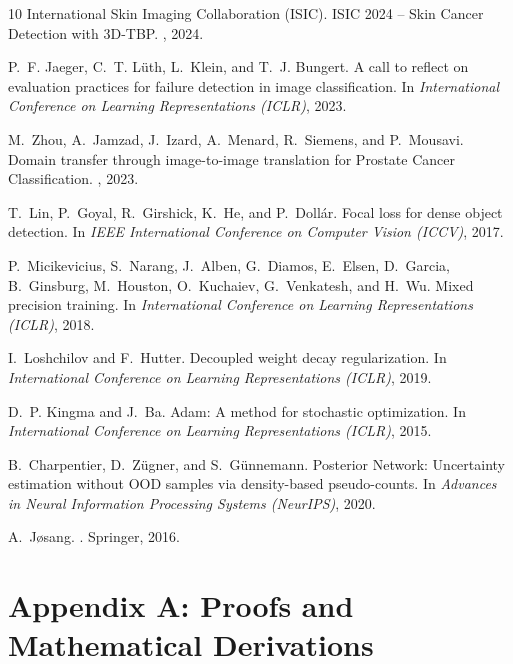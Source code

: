 \documentclass[letterpaper]{article} %
\begin{document}
\begin{thebibliography}{10}
International Skin Imaging Collaboration (ISIC).
\newblock ISIC 2024 -- Skin Cancer Detection with 3D-TBP.
, 2024.

P.~F. Jaeger, C.~T. L{\"u}th, L.~Klein, and T.~J. Bungert.
\newblock A call to reflect on evaluation practices for failure detection in image classification.
\newblock In {\em International Conference on Learning Representations (ICLR)}, 2023.

M.~Zhou, A.~Jamzad, J.~Izard, A.~Menard, R.~Siemens, and P.~Mousavi.
\newblock Domain transfer through image-to-image translation for Prostate Cancer Classification.
, 2023.

T.~Lin, P.~Goyal, R.~Girshick, K.~He, and P.~Doll{\'a}r.
\newblock Focal loss for dense object detection.
\newblock In {\em IEEE International Conference on Computer Vision (ICCV)}, 2017.

P.~Micikevicius, S.~Narang, J.~Alben, G.~Diamos, E.~Elsen, D.~Garcia, B.~Ginsburg, M.~Houston, O.~Kuchaiev, G.~Venkatesh, and H.~Wu.
\newblock Mixed precision training.
\newblock In {\em International Conference on Learning Representations (ICLR)}, 2018.

I.~Loshchilov and F.~Hutter.
\newblock Decoupled weight decay regularization.
\newblock In {\em International Conference on Learning Representations (ICLR)}, 2019.

D.~P. Kingma and J.~Ba.
\newblock Adam: A method for stochastic optimization.
\newblock In {\em International Conference on Learning Representations (ICLR)}, 2015.

B.~Charpentier, D.~Z{\"u}gner, and S.~G{\"u}nnemann.
\newblock Posterior Network: Uncertainty estimation without OOD samples via density-based pseudo-counts.
\newblock In {\em Advances in Neural Information Processing Systems (NeurIPS)}, 2020.

A.~J{\o}sang.
.
\newblock Springer, 2016.

\end{thebibliography}

\appendix

\section{Appendix A: Proofs and Mathematical Derivations}
\label{app:proofs}
\end{document}
